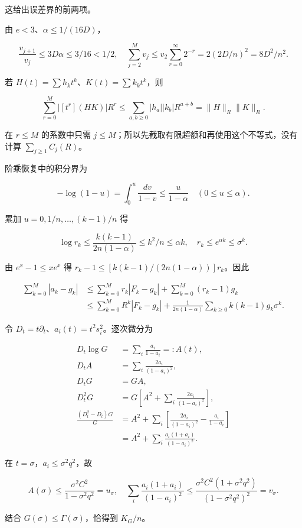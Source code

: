 \documentclass[11pt,a4paper]{article}
\begin{document}
这给出误差界的前两项。

由 \(e<3\)、\(\alpha\le1/(16D)\)，

\[\frac{v_{j+1}}{v_j}\le3D\alpha\le3/16<1/2,
\quad
\sum_{j=2}^Mv_j\le v_2\sum_{r=0}^{\infty}2^{-r}
=2(2D/n)^2=8D^2/n^2.\]

若 \(H(t)=\sum h_kt^k\)、\(K(t)=\sum k_kt^k\)，则

\[\sum_{r=0}^M|[t^r](HK)|R^r
\le\sum_{a,b\ge0}|h_a||k_b|R^{a+b}
=\|H\|_R\|K\|_R.\]

在 \(r\le M\) 的系数中只需 \(j\le M\)；所以先截取有限超额和再使用这个不等式，没有计算 \(\sum_{j\ge1}C_j(R)\)。

阶乘恢复中的积分界为

\[-\log(1-u)=\int_0^u\frac{dv}{1-v}\le\frac{u}{1-\alpha}
\quad(0\le u\le\alpha).\]

累加 \(u=0,1/n,\ldots,(k-1)/n\) 得

\[\log r_k\le\frac{k(k-1)}{2n(1-\alpha)}\le k^2/n\le\alpha k,
\quad r_k\le e^{\alpha k}\le\sigma^k.\]

由 \(e^x-1\le xe^x\) 得 \(r_k-1\le[k(k-1)/(2n(1-\alpha))]r_k\)。因此

\[\begin{aligned}
\sum_{k=0}^M|a_k-g_k|
&\le\sum_{k=0}^Mr_k|F_k-g_k|+\sum_{k=0}^M(r_k-1)g_k\\
&\le\sum_{k=0}^MR^k|F_k-g_k|
+\frac1{2n(1-\alpha)}\sum_{k\ge0}k(k-1)g_k\sigma^k.
\end{aligned}\]

令 \(D_t=t\partial_t\)、\(a_i(t)=t^2s_i^2\)。逐次微分为

\[\begin{aligned}
D_t\log G&=\sum_i\frac{a_i}{1-a_i}=:A(t),\\
D_tA&=\sum_i\frac{2a_i}{(1-a_i)^2},\\
D_tG&=GA,\\
D_t^2G&=G\left[A^2+\sum_i\frac{2a_i}{(1-a_i)^2}\right],\\
\frac{(D_t^2-D_t)G}{G}
&=A^2+\sum_i\left[\frac{2a_i}{(1-a_i)^2}-\frac{a_i}{1-a_i}\right]\\
&=A^2+\sum_i\frac{a_i(1+a_i)}{(1-a_i)^2}.
\end{aligned}\]

在 \(t=\sigma\)，\(a_i\le\sigma^2q^2\)，故

\[A(\sigma)\le\frac{\sigma^2C^2}{1-\sigma^2q^2}=u_\sigma,
\quad
\sum_i\frac{a_i(1+a_i)}{(1-a_i)^2}
\le\frac{\sigma^2C^2(1+\sigma^2q^2)}{(1-\sigma^2q^2)^2}=v_\sigma.\]

结合 \(G(\sigma)\le\Gamma(\sigma)\)，恰得到 \(K_G/n\)。
\end{document}
